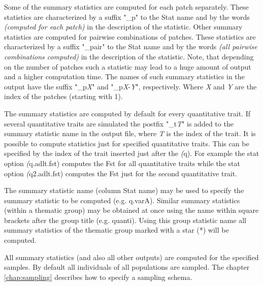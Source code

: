 \documentclass[letterpaper,12pt,oneside]{book}
\begin{document}
Some of the summary statistics are computed for each patch separately. These statistics are characterized by a suffix "\_p" to the \textsf{Stat name} and by the words \textit{(computed for each patch)} in the description of the statistic. Other summary statistics are computed for pairwise combinations of patches. These statistics are characterized by a suffix "\_pair" to the \textsf{Stat name} and by the words \textit{(all pairwise combinations computed)} in the description of the statistic. Note, that depending on the number of patches such a statistic may lead to a huge amount of output and a higher computation time. The names of such summary statistics in the output have the suffix "\_p\textit{X}" and "\_p\textit{X}-\textit{Y}", respectively. Where \textit{X} and \textit{Y} are the index of the patches (starting with 1). 

The summary statistics are computed by default for every quantitative trait. If several quantitative traits are simulated the postfix "\_t\textit{T}" is added to the summary statistic name in the output file, where \textit{T} is the index of the trait. It is possible to compute statistics just for specified quantitative traits. This can be specified by the index of the trait inserted just after the \textit(q). For example the stat option \textit(q.adlt.fst) computes the Fst for all quantitative traits while the stat option \textit(q2.adlt.fst) computes the Fst just for the second quantitative trait. 

The summary statistic name (column \textsf{Stat name}) may be used to specify the summary statistic to be computed (e.g. \textsf{q.varA}). Similar summary statistics (within a thematic group) may be obtained at once using the name within square brackets after the group title (e.g. \textsf{quanti}). Using this group statistic name all summary statistics of the thematic group marked with a star (*) will be computed. 

All summary statistics (and also all other outputs) are computed for the specified samples. By default all individuals of all populations are sampled. The chapter \ref{chap:sampling} describes how to specify a sampling schema.
\\
\\
\end{document}

